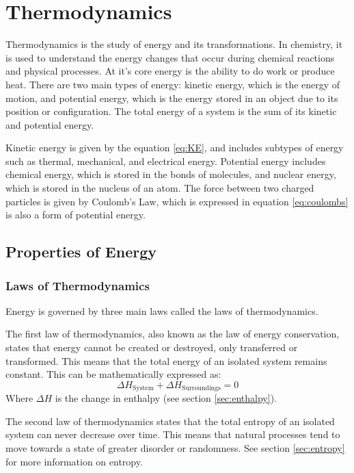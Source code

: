\section{Thermodynamics}
Thermodynamics is the study of energy and its transformations. In chemistry, it is used to understand the energy changes that occur during chemical reactions and physical processes. At it's core energy is the ability to do work or produce heat. There are two main types of energy: kinetic energy, which is the energy of motion, and potential energy, which is the energy stored in an object due to its position or configuration. The total energy of a system is the sum of its kinetic and potential energy. 

Kinetic energy is given by the equation \eqref{eq:KE}, and includes subtypes of energy such as thermal, mechanical, and electrical energy. Potential energy includes chemical energy, which is stored in the bonds of molecules, and nuclear energy, which is stored in the nucleus of an atom. The force between two charged particles is given by Coulomb's Law, which is expressed in equation \eqref{eq:coulombs} is also a form of potential energy. 

\subsection{Properties of Energy}
\subsubsection{Laws of Thermodynamics}
Energy is governed by three main laws called the laws of thermodynamics. 

The first law of thermodynamics, also known as the law of energy conservation, states that energy cannot be created or destroyed, only transferred or transformed. This means that the total energy of an isolated system remains constant. This can be mathematically expressed as:
\begin{equation}\label{eq:firstLaw}
    \Delta H_\text{System} + \Delta H_\text{Surroundings} = 0
\end{equation}
Where $\Delta H$ is the change in enthalpy (see section \ref{sec:enthalpy}). 

The second law of thermodynamics states that the total entropy of an isolated system can never decrease over time. This means that natural processes tend to move towards a state of greater disorder or randomness. See section \ref{sec:entropy} for more information on entropy.

